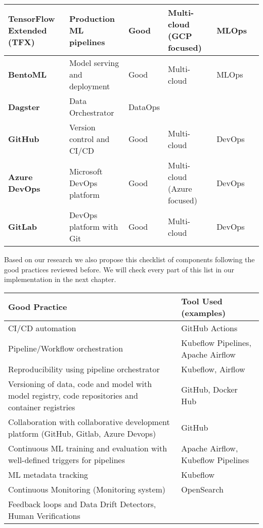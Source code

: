 \begin{longtable}{|p{2cm}|p{3.5cm}|p{2cm}|p{2cm}|p{1.5cm}|p{1.5cm}|}
    \textbf{TensorFlow Extended (TFX)} & Production ML pipelines & Good & Multi-cloud (GCP focused) & MLOps & \cite{Kreuzberger2022MachineLO} \\
    \hline

    \textbf{BentoML} & Model serving and deployment & Good & Multi-cloud & MLOps & \cite{9792270,BURGUENOROMERO2025107499,mlops-definition-tools-and-challenge} \\
    \hline

    \textbf{Dagster} & Data Orchestrator & DataOps & \cite{landscape} \\
    \hline

    \textbf{GitHub} & Version control and CI/CD & Good & Multi-cloud & DevOps & \cite{10.1145/3533378, mlops-gitops} \\
    \hline

    \textbf{Azure DevOps} & Microsoft DevOps platform & Good & Multi-cloud (Azure focused) & DevOps & \cite{Kreuzberger2022MachineLO,gift2021practical} \\
    \hline

    \textbf{GitLab} & DevOps platform with Git & Good & Multi-cloud & DevOps & \cite{9792270} \\
    \hline

\end{longtable}
\normalsize


Based on our research we also propose this checklist of components following the good practices reviewed before.
We will check every part of this list in our implementation in the next chapter.
\footnotesize
\begin{longtable}{|p{7cm}|p{6cm}|}
    \hline
    \textbf{Good Practice} & \textbf{Tool Used (examples)} \\
    \hline
    CI/CD automation & GitHub Actions\\
    \hline
    Pipeline/Workflow orchestration & Kubeflow Pipelines, Apache Airflow\\
    \hline
    Reproducibility using pipeline orchestrator & Kubeflow, Airflow \\
    \hline
    Versioning of data, code and model with model registry, code repositories and container registries & GitHub, Docker Hub \\
    \hline
    Collaboration with collaborative development platform (GitHub, Gitlab, Azure Devops) & GitHub \\
    \hline
    Continuous ML training and evaluation with well-defined triggers for pipelines & Apache Airflow, Kubeflow Pipelines\\
    \hline
    ML metadata tracking & Kubeflow \\
    \hline
    Continuous Monitoring (Monitoring system) & OpenSearch \\
    \hline
    Feedback loops and Data Drift Detectors, Human Verifications \\
    \hline
\end{longtable}
\normalsize